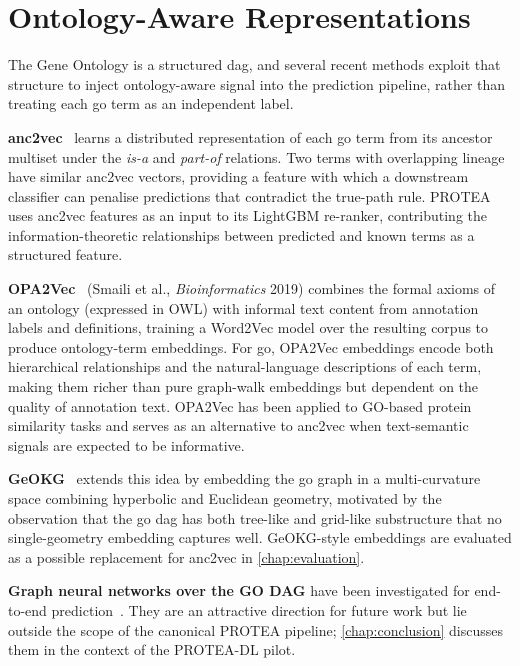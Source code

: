 \section{Ontology-Aware Representations}
\label{sec:related-go-embeddings}

The Gene Ontology is a structured \gls{dag}, and several recent methods exploit
that structure to inject ontology-aware signal into the prediction pipeline,
rather than treating each \gls{go} term as an independent label.

\textbf{anc2vec}~\cite{edera2022anc2vec} learns a distributed representation of
each \gls{go} term from its ancestor multiset under the \textit{is-a} and
\textit{part-of} relations. Two terms with overlapping lineage have similar
anc2vec vectors, providing a feature with which a downstream classifier can
penalise predictions that contradict the true-path rule. PROTEA uses anc2vec
features as an input to its LightGBM re-ranker, contributing the
information-theoretic relationships between predicted and known terms as a
structured feature.

\textbf{OPA2Vec}~\cite{smaili2018opa2vec} (Smaili et al., \textit{Bioinformatics}
2019) combines the formal axioms of an ontology (expressed in OWL) with informal
text content from annotation labels and definitions, training a Word2Vec model
over the resulting corpus to produce ontology-term embeddings. For \gls{go},
OPA2Vec embeddings encode both hierarchical relationships and the natural-language
descriptions of each term, making them richer than pure graph-walk embeddings but
dependent on the quality of annotation text. OPA2Vec has been applied to GO-based
protein similarity tasks and serves as an alternative to anc2vec when
text-semantic signals are expected to be informative.

\textbf{GeOKG}~\cite{geokg2025} extends this idea by embedding the \gls{go}
graph in a multi-curvature space combining hyperbolic and Euclidean geometry,
motivated by the observation that the \gls{go} \gls{dag} has both tree-like and
grid-like substructure that no single-geometry embedding captures well.
GeOKG-style embeddings are evaluated as a possible replacement for anc2vec in
\cref{chap:evaluation}.

\textbf{Graph neural networks over the GO DAG} have been investigated for
end-to-end prediction~\cite{kulmanov2022deepgozero}. They are an attractive
direction for future work but lie outside the scope of the canonical PROTEA
pipeline; \cref{chap:conclusion} discusses them in the context of the
PROTEA-DL pilot.

